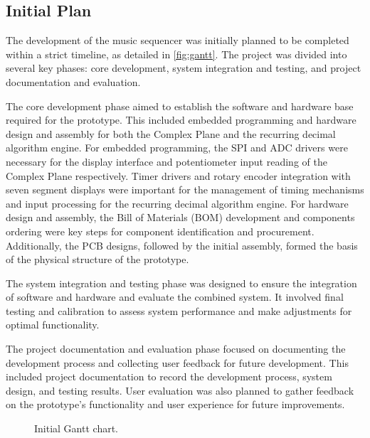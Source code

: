 \documentclass[12pt]{article}
\numberwithin{subsubsubsection}{subsubsection}
\begin{document}
\subsection{Initial Plan}

The development of the music sequencer was initially planned to be completed within a strict timeline, as detailed in \autoref{fig:gantt}. The project was divided into several key phases: core development, system integration and testing, and project documentation and evaluation.

The core development phase aimed to establish the software and hardware base required for the prototype. This included embedded programming and hardware design and assembly for both the Complex Plane and the recurring decimal algorithm engine. For embedded programming, the SPI and ADC drivers were necessary for the display interface and potentiometer input reading of the Complex Plane respectively. Timer drivers and rotary encoder integration with seven segment displays were important for the management of timing mechanisms and input processing for the recurring decimal algorithm engine. For hardware design and assembly, the Bill of Materials (BOM) development and components ordering were key steps for component identification and procurement. Additionally, the PCB designs, followed by the initial assembly, formed the basis of the physical structure of the prototype.

The system integration and testing phase was designed to ensure the integration of software and hardware and evaluate the combined system. It involved final testing and calibration to assess system performance and make adjustments for optimal functionality.

The project documentation and evaluation phase focused on documenting the development process and collecting user feedback for future development. This included project documentation to record the development process, system design, and testing results. User evaluation was also planned to gather feedback on the prototype's functionality and user experience for future improvements.

\begin{figure}[ht]
    \centering
    \caption{Initial Gantt chart.}
    \label{fig:gantt}
\end{figure}
\end{document}
